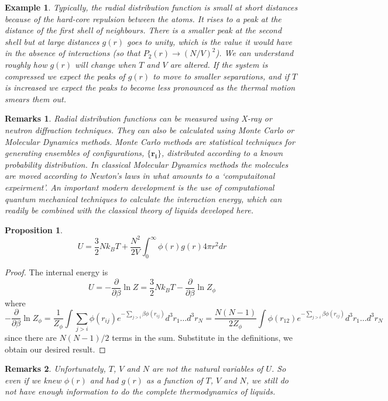 \documentclass[a4paper]{article}
\newtheorem{eg}{Example}[section]
\newtheorem{remarks}{Remarks}[section]
\theoremstyle{new}
\newtheorem{prop}{Proposition}[section]
\begin{document}
\begin{eg}
Typically, the radial distribution function is small at short distances because of the hard-core repulsion between the atoms. It rises to a peak at the distance of the first shell of neighbours. There is a smaller peak at the second shell but at large distances $g(r)$ goes to unity, which is the value it would have in the absence of interactions (so that $P_2(r)\rightarrow(N/V)^2$). We can understand roughly how $g(r)$ will change when $T$ and $V$ are altered. If the system is compressed we expect the peaks of $g(r)$ to move to smaller separations, and if $T$ is increased we expect the peaks to become less pronounced as the thermal motion smears them out.
\end{eg}
\begin{remarks}
Radial distribution functions can be measured using X-ray or neutron diffraction techniques. They can also be calculated using Monte Carlo or Molecular Dynamics methods. Monte Carlo methods are statistical techniques for generating ensembles of configurations, $\{\mathbf{r_i}\}$, distributed according to a known probability distribution. In classical Molecular Dynamics methods the molecules are moved according to Newton's laws in what amounts to a `computaitonal expeirment'. An important modern development is the use of computational quantum mechanical techniques to calculate the interaction energy, which can readily be combined with the classical theory of liquids developed here.
\end{remarks}
\begin{prop}
\begin{equation}
U=\frac{3}{2}Nk_BT+\frac{N^2}{2V}\int_0^\infty\phi(r)g(r)4\pi r^2dr\label{result1}
\end{equation}
\end{prop}
\begin{proof}
The internal energy is
$$U=-\frac{\partial}{\partial\beta}\ln Z=\frac{3}{2}Nk_BT-\frac{\partial}{\partial\beta}\ln Z_\phi$$
where
$$-\frac{\partial}{\partial\beta}\ln Z_\phi=\frac{1}{Z_\phi}\int\sum_{j>i}\phi(r_{ij})e^{-\sum_{j>i}\beta\phi(r_{ij})}d^3r_1\dots d^3r_N=\frac{N(N-1)}{2Z_\phi}\int\phi(r_{12})e^{-\sum_{j>i}\beta\phi(r_{ij})}d^3r_1\dots d^3r_N$$
since there are $N(N-1)/2$ terms in the sum. Substitute in the definitions, we obtain our desired result.
\end{proof}
\begin{remarks}
Unfortunately, $T$, $V$ and $N$ are not the natural variables of $U$. So even if we knew $\phi(r)$ and had $g(r)$ as a function of $T$, $V$ and $N$, we still do not have enough information to do the complete thermodynamics of liquids.
\end{remarks}
\end{document}
